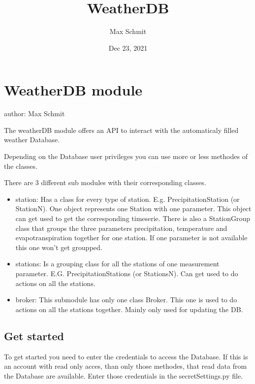 \documentclass[letterpaper,10pt,english]{sphinxmanual}
\title{WeatherDB}
\date{Dec 23, 2021}
\author{Max Schmit}
\begin{document}
\pagestyle{empty}
\sphinxmaketitle
\pagestyle{plain}
\sphinxtableofcontents
\pagestyle{normal}
\label{\detokenize{index::doc}}



\chapter{WeatherDB \sphinxhyphen{} module}
\label{\detokenize{README:weatherdb-module}}\label{\detokenize{README::doc}}
\sphinxAtStartPar
author: Max Schmit

\sphinxAtStartPar
The weather\sphinxhyphen{}DB module offers an API to interact with the automaticaly filled weather Database.

\sphinxAtStartPar
Depending on the Database user privileges you can use more or less methodes of the classes.

\sphinxAtStartPar
There are 3 different sub modules with their corresponding classes.
\begin{itemize}
\item {} 
\sphinxAtStartPar
station:
Has a class for every type of station. E.g. PrecipitationStation (or StationN).
One object represents one Station with one parameter.
This object can get used to get the corresponding timeserie.
There is also a StationGroup class that groups the three parameters precipitation, temperature and evapotranspiration together for one station. If one parameter is not available this one won’t get groupped.

\item {} 
\sphinxAtStartPar
stations:
Is a grouping class for all the stations of one measurement parameter. E.G. PrecipitationStations (or StationsN).
Can get used to do actions on all the stations.

\item {} 
\sphinxAtStartPar
broker:
This submodule has only one class Broker. This one is used to do actions on all the stations together. Mainly only used for updating the DB.

\end{itemize}


\section{Get started}
\label{\detokenize{README:get-started}}
\sphinxAtStartPar
To get started you need to enter the credentials to access the Database. If this is an account with read only acces, than only those methodes, that read data from the Database are available.
Enter those credentials in the secretSettings.py file.
\end{document}
